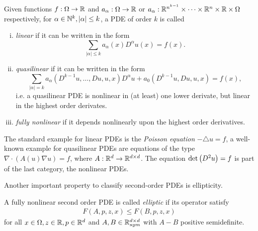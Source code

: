 \begin{definition} \label{def: categories of PDEs}
	Given functions  $f:\Omega \rightarrow \mathbb{R}$ and $a_{\alpha}:\Omega \rightarrow \mathbb{R}$ or $a_{\alpha}:\mathbb{R}^{n^{k-1}} \times \dots \times \mathbb{R}^n \times \mathbb{R} \times \Omega$ respectively, for $\alpha \in \mathbb{N}^{k}, |\alpha| \leq k$, a PDE of order $k$ is called
	\begin{enumerate}[(i)]
		\item \emph{linear} if it can be written in the form
		\[
			\sum_{|\alpha| \leq k} a_{\alpha} (x) D^{\alpha} u(x) = f(x).
		\] 
		
		
		\item \emph{quasilinear} if it can be written in the form
		\[
			\sum_{|\alpha| = k} a_{\alpha}(D^{k-1}u, \dots, Du, u, x) D^{\alpha} u + a_0(D^{k-1}u, Du, u, x)= f(x),
		\]	
		i.e. a quasilinear PDE is nonlinear in (at least) one lower derivate, but linear in the highest order derivates.
		
		\item \emph{fully nonlinear} if it depends nonlinearly upon the highest order derivatives.
	\end{enumerate}
\end{definition}
The standard example for linear PDEs is the \emph{Poisson equation} $-\triangle u = f$,
a well-known example for quasilinear PDEs are equations of the type $\nabla \cdot (A(u) \nabla u) = f$, where $A: \mathbb{R}^d \rightarrow \mathbb{R}^{d \times d}  $. The \MA equation $\det{\left(D^2 u\right)} = f$ is part of the last category, the nonlinear PDEs. 

Another important property to classify second-order PDEs is ellipticity. 
\begin{definition}
	A fully nonlinear second order PDE is called \emph{elliptic} if its operator satisfy
	\begin{align}
		F(A,p,z,x) \leq F(B,p,z,x) \label{eq: ellipitic PDE}
	\end{align}
for all $x \in \Omega, z \in \mathbb{R}, p \in \mathbb{R}^d$ and $A,B \in \mathbb{R}^{d \times d}_{sym}$  with $A-B$ positive semidefinite.

\end{definition}

